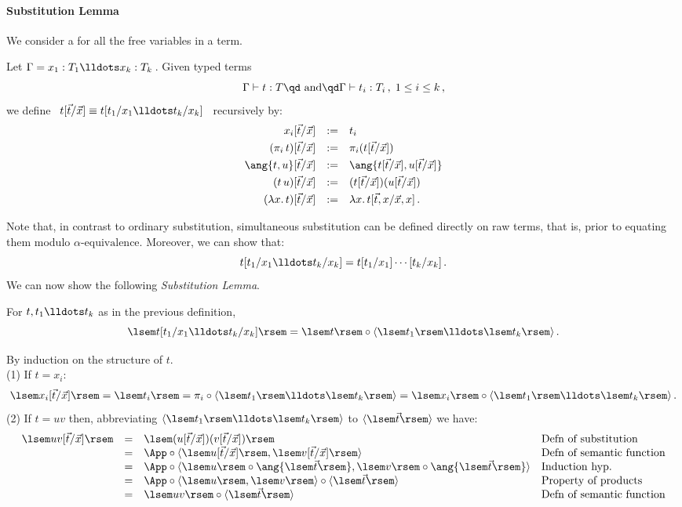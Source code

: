 \documentclass{svmult}
\begin{document}
\paragraph{Substitution Lemma} We consider a  for all the free variables in a term.
\begin{mydefinition}
Let $\Gamma=x_{1}:T_{1}\lldots x_{k}:T_{k}$\,. Given typed terms
\[ \Gamma \vdash t : T  \text{\qd and\qd} \Gamma \vdash t_{i} : T_{i}\,,\; 1 \leq i \leq k\,,\]
we define \ $t[\vec{t}/\vec{x}] \equiv t[t_{1}/x_{1}\lldots t_{k}/x_{k}]$ \ recursively by:
\[\begin{array}{rcl}
x_{i}[\vec{t}/\vec{x}]  & := & t_{i}\\[1.1mm]
(\pi_i\,t)[\vec{t}/\vec{x}] & := & \pi_i(t[\vec{t}/\vec{x}]) \\[1.1mm]
\ang{t,u}[\vec{t}/\vec{x}] & := & \ang{t[\vec{t}/\vec{x}],u[\vec{t}/\vec{x}]} \\[1.1mm]
(t\,u)[\vec{t}/\vec{x}]  & := & (t[\vec{t}/\vec{x}])(u[\vec{t}/\vec{x}]) \\[1.1mm]
(\lambda x.\,t)[\vec{t}/\vec{x}]  & := & \lambda x.\, t[\vec{t},x/\vec{x},x]\,.
\end{array}\]\deq[-1]
\end{mydefinition}
%
Note that, in contrast to ordinary substitution, simultaneous substitution can be defined directly on raw terms, that is, prior to equating them
modulo $\alpha\text{-equivalence}$. Moreover, we can show that:
\[ t[t_{1}/x_{1}\lldots t_{k}/x_{k}] = t[t_{1}/x_{1}]\cdots[t_{k}/x_{k}]\,. \]
%
We can now show the following \emph{Substitution Lemma}.
%
\begin{myproposition} For $t,t_1\lldots t_k$ as in the previous definition,
\[ \lsem t[t_{1}/x_{1}\lldots t_{k}/x_{k}] \rsem = \lsem t \rsem \circ \langle \lsem t_{1} \rsem \lldots \lsem t_{k} \rsem \rangle\,. \]
\end{myproposition}
\proof By induction on the structure of $t$.
\\
(1) If $t = x_{i}$:
\[ \lsem x_{i}[\vec{t}/\vec{x}]  \rsem = \lsem t_{i} \rsem = \pi_{i} \circ  \langle \lsem t_{1} \rsem \lldots \lsem t_{k}
\rsem \rangle = \lsem x_{i} \rsem \circ  \langle \lsem t_{1} \rsem \lldots \lsem t_{k} \rsem \rangle\,. \]
%
(2) If $t = uv$ then, abbreviating $\langle \lsem t_{1} \rsem \lldots \lsem t_{k} \rsem \rangle$ to $\langle \lsem \vec{t} \rsem \rangle$ we have:
\[ \begin{array}{rcl@{\quad}l}
\lsem uv[\vec{t}/\vec{x}] \rsem & = & \lsem  (u[\vec{t}/\vec{x}])(v[\vec{t}/\vec{x}])\rsem & \text{Defn of substitution} \\
& = & \App \circ \langle \lsem u[\vec{t}/\vec{x}] \rsem, \lsem v[\vec{t}/\vec{x}] \rsem \rangle & \text{Defn of semantic function} \\
& = &  \App \circ \langle \lsem u \rsem\circ\ang{\lsem\vec{t}\rsem}, \lsem v \rsem\circ\ang{\lsem\vec{t}\rsem}\rangle & \text{Induction hyp.} \\
& = &  \App \circ \langle \lsem u \rsem  , \lsem v \rsem \rangle \circ \langle \lsem \vec{t} \rsem \rangle & \text{Property of products} \\
& = & \lsem uv \rsem  \circ \langle \lsem \vec{t} \rsem \rangle & \text{Defn of semantic function}
\end{array}\]
\end{document}
